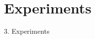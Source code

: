 \documentclass[xcolor=table]{beamer}
\begin{document}




\section{Experiments}
\begin{frame}{ }
\huge{3. Experiments}
\end{frame}














\end{document}
